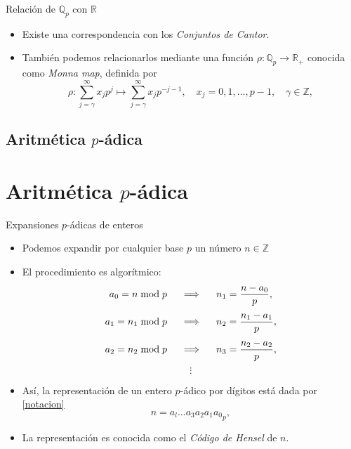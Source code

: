 \documentclass{beamer}
\theoremstyle{definition}
\numberwithin{equation}{section}
\renewcommand{\leq}{\leqslant}
\newcommand{\Z}{\mathbb{Z}}
\newcommand{\R}{\mathbb{R}}
\newcommand{\Qp}{\mathbb{Q}_p}
\newcommand{\pnorm}[1]{\|#1\|_p}
\begin{document}
\begin{frame}{Relación de $\Qp$ con $\R$}
\begin{itemize}
	\item Existe una correspondencia con los \textit{Conjuntos de Cantor}.
	\item También podemos relacionarlos mediante una función $\rho\colon\Qp\to\R_{+}$ conocida como \textit{Monna map}, definida por
	\begin{equation}\label{Monna}
	\rho: \sum_{j=\gamma}^{\infty} x_{j} p^{j} \mapsto \sum_{j=\gamma}^{\infty} x_{j} p^{-j-1}, \quad x_{j}=0,1, \ldots, p-1, \quad \gamma \in \mathbb{Z},
	\end{equation}
\end{itemize}
\end{frame}

\subsection{Aritmética $p$-ádica}
\section*{Aritmética $p$-ádica}
\begin{frame}{Expansiones $p$-ádicas de enteros}
	\begin{itemize}[<+- | alert@+>]
		\item Podemos expandir por cualquier base $p$ un número $n\in\Z$
		\item El procedimiento es algorítmico:
		$$a_0 =n\bmod p\hspace{5mm} \Longrightarrow \hspace{5mm} n_1 = \frac{n-a_0}{p},$$ $$a_1 =n_1\bmod p \hspace{5mm} \Longrightarrow \hspace{5mm} n_2 = \frac{n_1-a_1}{p},$$ $$a_2 =n_2\bmod p \hspace{5mm} \Longrightarrow \hspace{5mm} n_3 = \frac{n_2-a_2}{p},$$
		$$\vdots$$
		\item Así, la representación de un entero $p$-ádico por dígitos está dada por \ref{notacion}
		$$n={ a_{l} \ldots a_{3} a_{2} a_{1} a_{0}}_p,$$
		\item La representación es conocida como el \textit{Código de Hensel} de $n$.
	\end{itemize}
\end{frame}
\end{document}
